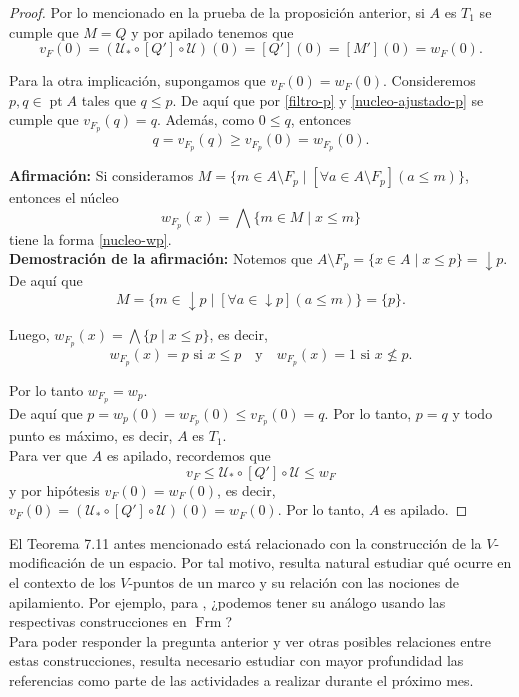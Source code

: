 \documentclass[12pt]{article}
\DeclareMathOperator{\Frm}{Frm}
\DeclareMathOperator{\pt}{pt}
\begin{document}
\begin{proof}
Por lo mencionado en la prueba de la proposición anterior, si $A$ es $T_1$ se cumple que $M=Q$ y por apilado tenemos que 
\[
v_F(0)=(\mathcal{U}_*\circ [Q']\circ \mathcal{U})(0)=[Q'](0)=[M'](0)=w_F(0).
\]

Para la otra implicación, supongamos que $v_F(0)=w_F(0)$. Consideremos $p, q\in \pt A$ tales que $q\leq p$. De aquí que
por \eqref{filtro-p} y \eqref{nucleo-ajustado-p} se cumple que $v_{F_p}(q)=q$. Además, como $0\leq q$, entonces
\[
q=v_{F_p}(q)\geq v_{F_p}(0)=w_{F_p}(0).
\]

\textbf{Afirmación:} Si consideramos $M=\{m\in A\setminus F_p\mid[\forall a\in A\setminus F_p] (a\leq m)\}$, entonces el núcleo
\[
w_{F_p}(x)=\bigwedge\{m\in M\mid x\leq m\}
\]
tiene la forma \eqref{nucleo-wp}.\\

\textbf{Demostración de la afirmación:} Notemos que $A\setminus F_p=\{x\in A\mid x\leq p\}=\downarrow p$. De aquí que
\[
M=\{m\in \downarrow p\mid [\forall a\in \downarrow p](a\leq m)\}=\{p\}.
\]

Luego, $w_{F_p}(x)=\bigwedge\{p\mid x\leq p\}$, es decir, 
\[
w_{F_p}(x)=p \text{ si } x\leq p\quad \text{y}\quad w_{F_p}(x)=1 \text{ si } x\nleq p.
\]

Por lo tanto $w_{F_p}=w_p$.\\

De aquí que $p=w_p(0)=w_{F_p}(0)\leq v_{F_p}(0)=q$. Por lo tanto, $p=q$ y todo punto es máximo, es decir, $A$ es $T_1$.\\

Para ver que $A$ es apilado, recordemos que
\[
v_F\leq \mathcal{U}_*\circ [Q']\circ \mathcal{U}\leq w_F
\]
y por hipótesis $v_F(0)=w_F(0)$, es decir, $v_F(0)=(\mathcal{U}_*\circ [Q']\circ \mathcal{U})(0)=w_F(0)$. Por lo tanto, $A$ es apilado.
\end{proof}

El Teorema 7.11 antes mencionado está relacionado con la construcción de la $V$-modificación de un espacio. Por tal motivo,
resulta natural estudiar qué ocurre en el contexto de los $V$-puntos de un marco y su relación con las nociones de apilamiento. 
Por ejemplo, para \cite[Teorema 7.8]{sexton2006ordinal}, ¿podemos tener su análogo usando las respectivas construcciones en $\Frm$?\\

Para poder responder la pregunta anterior y ver otras posibles relaciones entre estas construcciones, resulta necesario estudiar con mayor profundidad 
las referencias \cite{JohnstoneVietorisMonad, simmons2004vietoris} como parte de las actividades a realizar durante el próximo mes.\\
\end{document}
